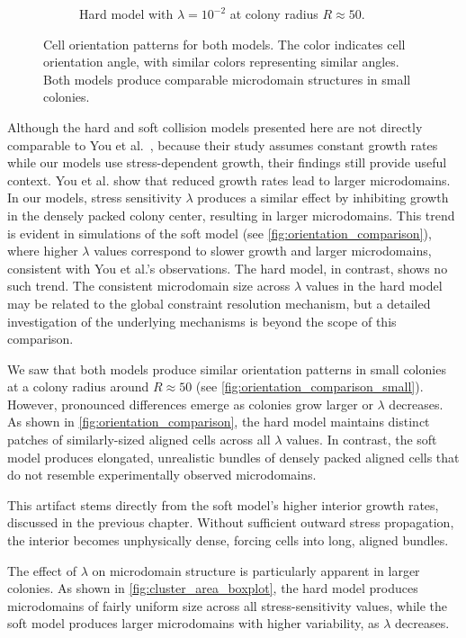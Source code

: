 \documentclass[conference]{IEEEtran}
\begin{document}
\begin{figure}[h]
\begin{subfigure}[b]{0.49\columnwidth}
        \caption{Hard model with $\lambda = 10^{-2}$ at colony radius $R \approx 50$.}
    \end{subfigure}
    \caption{Cell orientation patterns for both models. The color indicates cell orientation angle, with similar colors representing similar angles. Both models produce comparable microdomain structures in small colonies.}
    \label{fig:orientation_comparison_small}
\end{figure}

Although the hard and soft collision models presented here are not directly comparable to You et al.~\cite{You2018}, because their study assumes constant growth rates while our models use stress-dependent growth, their findings still provide useful context. You et al. show that reduced growth rates lead to larger microdomains. In our models, stress sensitivity $\lambda$ produces a similar effect by inhibiting growth in the densely packed colony center, resulting in larger microdomains. This trend is evident in simulations of the soft model (see \autoref{fig:orientation_comparison}), where higher $\lambda$ values correspond to slower growth and larger microdomains, consistent with You et al.'s observations. The hard model, in contrast, shows no such trend. The consistent microdomain size across $\lambda$ values in the hard model may be related to the global constraint resolution mechanism, but a detailed investigation of the underlying mechanisms is beyond the scope of this comparison.

We saw that both models produce similar orientation patterns in small colonies at a colony radius around $R \approx 50$ (see \autoref{fig:orientation_comparison_small}). However, pronounced differences emerge as colonies grow larger or $\lambda$ decreases. As shown in \autoref{fig:orientation_comparison}, the hard model maintains distinct patches of similarly-sized aligned cells across all $\lambda$ values. In contrast, the soft model produces elongated, unrealistic bundles of densely packed aligned cells that do not resemble experimentally observed microdomains.

This artifact stems directly from the soft model's higher interior growth rates, discussed in the previous chapter. Without sufficient outward stress propagation, the interior becomes unphysically dense, forcing cells into long, aligned bundles.

The effect of $\lambda$ on microdomain structure is particularly apparent in larger colonies. As shown in \autoref{fig:cluster_area_boxplot}, the hard model produces microdomains of fairly uniform size across all stress-sensitivity values, while the soft model produces larger microdomains with higher variability, as $\lambda$ decreases.
\end{document}
